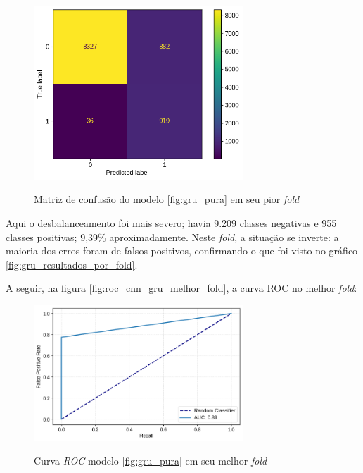 \begin{figure}[H]
  \centering
  \caption{Matriz de confusão do modelo \ref{fig:gru_pura} em seu pior \textit{fold}}
   \includegraphics[width=0.7\textwidth]{figuras/modelos_resultados/gru/matriz_confusao_pior_fold_gru_alt.png} %
  \label{fig:matriz_confusao_pior_fold_gru}
\end{figure}

Aqui o desbalanceamento foi mais severo; havia 9.209 classes negativas e 955 classes positivas; 9,39\% aproximadamente. 
Neste \textit{fold}, a situação se inverte: a maioria dos erros foram de falsos positivos, confirmando o que foi visto no 
gráfico \ref{fig:gru_resultados_por_fold}.


A seguir, na figura \ref{fig:roc_cnn_gru_melhor_fold}, a curva ROC no melhor \textit{fold}:

\begin{figure}[H]
  \centering
  \caption{Curva \textit{ROC} modelo \ref{fig:gru_pura} em seu melhor \textit{fold}}
   \includegraphics[width=0.7\textwidth]{figuras/modelos_resultados/gru/roc_gru_melhor_fold.png} %
  \label{fig:roc_melhor_fold_gru}
\end{figure}

